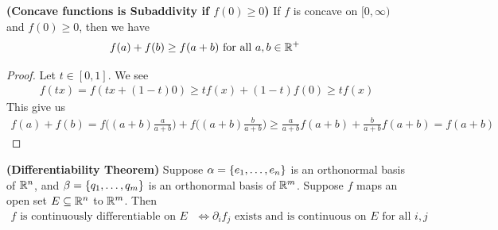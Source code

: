 \documentclass{report}
\begin{document}
\begin{lemma}
\label{CfiS}
\textbf{(Concave functions is Subaddivity if  $f(0)\geq 0$)} If $f$ is concave on  $[0,\infty)$ and $f(0)\geq 0$, then we have 
\begin{align*}
f(a)+f(b)\geq f(a+b)\text{ for all $a,b \in\mathbb{R}^+$ }
\end{align*}
\end{lemma}
\begin{proof}
Let $t \in [0,1]$. We see 
\begin{align*}
f(tx)=f(tx+(1-t)0)\geq tf(x)+(1-t)f(0)\geq t f(x)
\end{align*}
This give us 
\begin{align*}
f(a)+f(b)=f\big( (a+b) \frac{a}{a+b} \big)+f\big((a+b) \frac{b}{a+b} \big)\geq \frac{a}{a+b}f(a+b)+\frac{b}{a+b}f(a+b)=f(a+b)
\end{align*}
\end{proof}
\begin{theorem}
\label{DT}
\textbf{(Differentiability Theorem)} Suppose  $\alpha =\{ e_1,\dots ,e_n \}$ is an orthonormal basis of $\mathbb{R}^n$, and $\beta =\{ q_1,\dots ,q_m \}$ is an orthonormal basis of  $\mathbb{R}^m$. Suppose  $f$ maps an open set $E\subseteq\mathbb{R}^n$ to $\mathbb{R}^m$.  Then  
\begin{align*}
f\text{ is continuously differentiable on $E$ }\iff \partial_if_j\text{ exists and is continuous on $E$ for all $i,j$ }
\end{align*}
\end{theorem}
\end{document}
